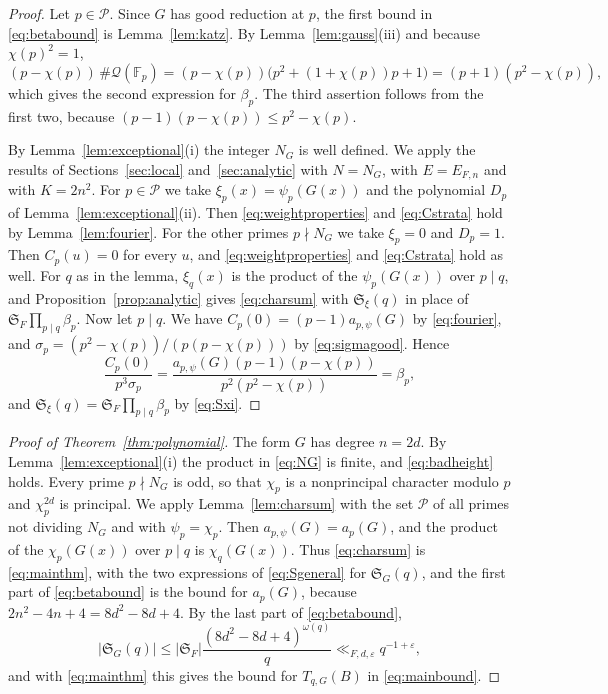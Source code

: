 \documentclass[11pt]{amsart}
\numberwithin{equation}{section}
\numberwithin{figure}{section}
\theoremstyle{definition}
\renewcommand{\S}{\mathfrak{S}}
\newcommand{\eps}{\varepsilon}
\newcommand{\abs}[1]{\lvert #1\rvert}
\newcommand{\Fp}{\mathbb F_p}
\newcommand{\Qc}{\mathcal Q}
\begin{document}
\begin{proof}
Let $p\in\mathcal P$. Since $G$ has good reduction at $p$, the first
bound in \eqref{eq:betabound} is Lemma~\ref{lem:katz}. By
Lemma~\ref{lem:gauss}(iii) and because $\chi(p)^2=1$,
\[
 (p-\chi(p))\,\#\Qc(\Fp)=(p-\chi(p))\big(p^2+(1+\chi(p))p+1\big)
 =(p+1)(p^2-\chi(p)),
\]
which gives the second expression for $\beta_p$. The third assertion
follows from the first two, because
$(p-1)(p-\chi(p))\le p^2-\chi(p)$.

By Lemma~\ref{lem:exceptional}(i) the integer $N_G$ is well defined.
We apply the results of Sections~\ref{sec:local}
and~\ref{sec:analytic} with $N=N_G$, with $E=E_{F,n}$ and with
$K=2n^2$. For $p\in\mathcal P$ we take $\xi_p(x)=\psi_p(G(x))$ and
the polynomial $D_p$ of Lemma~\ref{lem:exceptional}(ii). Then
\eqref{eq:weightproperties} and \eqref{eq:Cstrata} hold by
Lemma~\ref{lem:fourier}. For the other primes $p\nmid N_G$ we take
$\xi_p=0$ and $D_p=1$. Then $C_p(u)=0$ for every $u$, and
\eqref{eq:weightproperties} and \eqref{eq:Cstrata} hold as well. For
$q$ as in the lemma, $\xi_q(x)$ is the product of the
$\psi_p(G(x))$ over $p\mid q$, and Proposition~\ref{prop:analytic}
gives \eqref{eq:charsum} with $\S_\xi(q)$ in place of
$\S_F\prod_{p\mid q}\beta_p$. Now let $p\mid q$. We have
$C_p(0)=(p-1)a_{p,\psi}(G)$ by \eqref{eq:fourier}, and
$\sigma_p=(p^2-\chi(p))/(p(p-\chi(p)))$ by \eqref{eq:sigmagood}.
Hence
\[
 \frac{C_p(0)}{p^3\sigma_p}
 =\frac{a_{p,\psi}(G)(p-1)(p-\chi(p))}{p^2(p^2-\chi(p))}=\beta_p,
\]
and $\S_\xi(q)=\S_F\prod_{p\mid q}\beta_p$ by \eqref{eq:Sxi}.
\end{proof}

\begin{proof}[Proof of Theorem~\ref{thm:polynomial}]
The form $G$ has degree $n=2d$. By Lemma~\ref{lem:exceptional}(i)
the product in \eqref{eq:NG} is finite, and \eqref{eq:badheight}
holds. Every prime $p\nmid N_G$ is odd, so that $\chi_p$ is a
nonprincipal character modulo $p$ and $\chi_p^{2d}$ is principal. We
apply Lemma~\ref{lem:charsum} with the set $\mathcal P$ of all primes
not dividing $N_G$ and with $\psi_p=\chi_p$. Then
$a_{p,\psi}(G)=a_p(G)$, and the product of the $\chi_p(G(x))$ over
$p\mid q$ is $\chi_q(G(x))$. Thus \eqref{eq:charsum} is
\eqref{eq:mainthm}, with the two expressions of \eqref{eq:Sgeneral}
for $\S_G(q)$, and the first part of \eqref{eq:betabound} is the
bound for $a_p(G)$, because $2n^2-4n+4=8d^2-8d+4$. By the last part
of \eqref{eq:betabound},
\[
 \abs{\S_G(q)}\le\abs{\S_F}\frac{(8d^2-8d+4)^{\omega(q)}}q
 \ll_{F,d,\eps}q^{-1+\eps},
\]
and with \eqref{eq:mainthm} this gives the bound for $T_{q,G}(B)$ in
\eqref{eq:mainbound}.
\end{proof}
\end{document}
